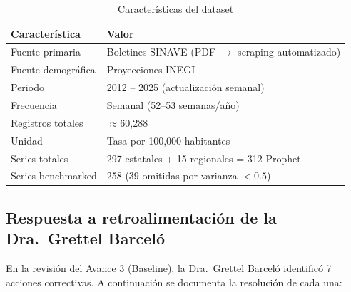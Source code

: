 \documentclass[12pt, letterpaper]{article}
\begin{document}
\begin{table}[H]
\centering
\caption{Características del dataset}
\label{tab:dataset}
\begin{tabular}{ll}
\toprule
\textbf{Característica} & \textbf{Valor} \\
\midrule
Fuente primaria        & Boletines SINAVE (PDF $\to$ scraping automatizado) \\
Fuente demográfica     & Proyecciones INEGI \\
Periodo                & 2012 -- 2025 (actualización semanal) \\
Frecuencia             & Semanal (52--53 semanas/año) \\
Registros totales      & $\approx$60,288 \\
Unidad                 & Tasa por 100,000 habitantes \\
Series totales         & 297 estatales + 15 regionales = 312 Prophet \\
Series benchmarked     & 258 (39 omitidas por varianza $< 0.5$) \\
\bottomrule
\end{tabular}
\end{table}

\subsection{Respuesta a retroalimentación de la Dra.\ Grettel Barceló}

En la revisión del Avance 3 (Baseline), la Dra.\ Grettel Barceló identificó 7 acciones correctivas. A continuación se documenta la resolución de cada una:
\end{document}
